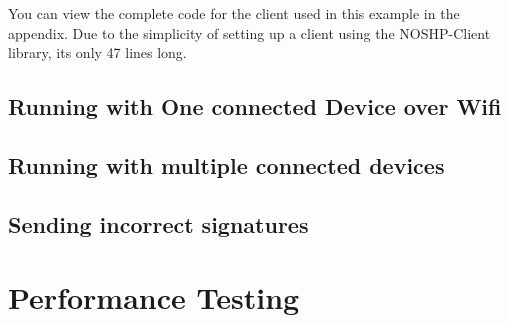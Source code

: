 You can view the complete code for the client used in this example in the appendix. Due to the simplicity of setting up a client using the NOSHP-Client library, its only 47 lines long.

\subsection{Running with One connected Device over Wifi} 
\subsection{Running with multiple connected devices}
\subsection{Sending incorrect signatures}
\section{Performance Testing}
